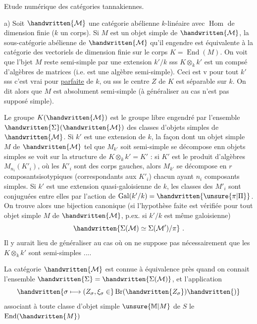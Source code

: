 Etude numérique des catégories tannakiennes.

a) Soit $\handwritten{\mathcal{M}}$ une catégorie abélienne $k$-linéaire avec $\operatorname{Hom}$ de dimension finie ($k$ un corps). Si $M$ est un objet simple de $\handwritten{\mathcal{M}}$, la sous-catégorie abélienne de $\handwritten{\mathcal{M}}$ qu'il engendre est équivalente à la catégorie des vectoriels de dimension finie sur le corps $K=\operatorname{End}(M)$. On voit  que l'bjet $M$ reste semi-simple par une extension $k'/k$ sss $K\otimes_k k'$ est un compsé  d'algèbres de matrices (i.e. est une algèbre semi-simple). Ceci est v pour tout $k'$ sss c'est vrai pour  \uline{parfaite} de $k$, ou sss le centre  $Z$ de $K$ est séparable sur $k$. On dit alors que $M$ est absolument semi-simple (à généraliser au cas n'est pas supposé simple).

Le groupe $K(\handwritten{\mathcal{M}})$ est le groupe libre engendré par l'ensemble $\handwritten{\Sigma}(\handwritten{\mathcal{M}})$ des classes d'objets simples de $\handwritten{\mathcal{M}}$. Si $k'$ est une extension de $k$, la façon dont un objet simple $M$ de $\handwritten{\mathcal{M}}$ tel que $M_{k'}$ soit semi-simple se décompose enn objets simples se voit sur la structure de $K\otimes_k k'=K'$ : si $K'$ est le produit d'algèbres $M_{n_i}(K'_i)$, où les $K'_i$ sont des corps gauches, alors $M_{k'}$ se décompose en $r$ composantsisotypiques (correspondants aux $K'_i$) chacun ayant $n_i$ composants simples. Si $k'$ est une extension quasi-galoisienne de $k$, les classes des $M'_i$ sont conjuguées entre elles par l'action de $\operatorname{Gal}(k'/k)=\handwritten{\unsure{\pi|\Pi}}$. On trouve alors une bijection canonique (si l'hypothèse faite est vérifiée pour tout objet simple  $M$ de $\handwritten{\mathcal{M}}$, p.ex. si $k'/k$ est même galoisienne)
\[
\handwritten{\Sigma(\mathcal{M})\simeq\Sigma(\mathcal{M}')/\pi}\ .
\]
Il y aurait lieu de généraliser au cas où on ne suppose pas nécessairement que les $K\otimes_k k'$ sont semi-simples ....

 La catégorie $\handwritten{\mathcal{M}}$ est connue à équivalence près quand on connait l'ensemble $\handwritten{\Sigma}=\handwritten{\Sigma(\mathcal{M})}$, et l'application
\[
\handwritten{\sigma\longmapsto (Z_\sigma,\xi_\sigma\in}\operatorname{Br}(\handwritten{Z_\sigma})\handwritten{)}
\]
associant à toute classe\inserted{\handwritten{$\sigma$}} d'objet simple $\unsure{\mathbb{M}|M}$ de $S$ le  $\operatorname{End}(\handwritten{M})$
